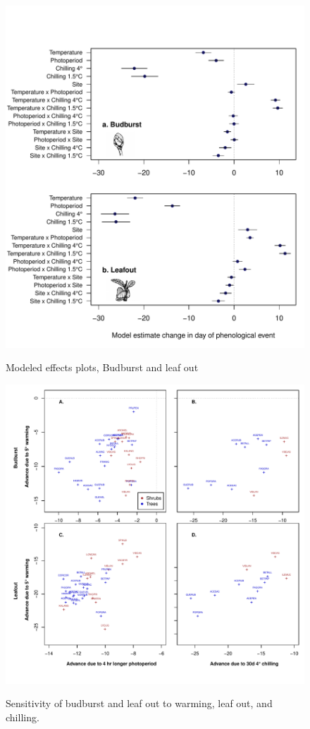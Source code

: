 \documentclass[11pt]{article}
\begin{document}
\begin{figure}
\begin{center}
\caption{Modeled effects plots, Budburst and leaf out}
\includegraphics[scale=0.8]{Fig1_bb_lo}
\label{fig2}
\end{center}
\end{figure}


\begin{figure}
\caption{Sensitivity of budburst and leaf out to warming, leaf out, and chilling.}
\includegraphics[scale=0.9]{Fig2_4panel}
\label{fig3}
\end{figure}
\end{document}
